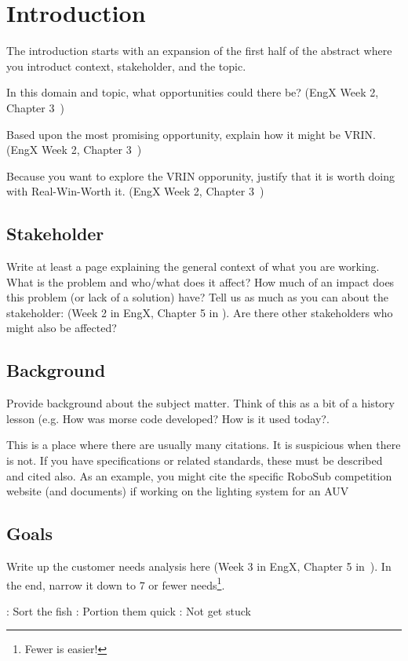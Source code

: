 \chapter{Introduction\label{cha:introduction}}

The introduction starts with an expansion of the first half of the abstract where you introduct context, stakeholder, and the topic.

In this domain and topic, what opportunities could there be?  (EngX Week 2, Chapter 3~\cite{ulrich2020product-design-development})

Based upon the most promising opportunity, explain how it might be VRIN. (EngX Week 2, Chapter 3~\cite{ulrich2020product-design-development})

Because you want to explore the VRIN opporunity, justify that it is worth doing with Real-Win-Worth it. (EngX Week 2, Chapter 3~\cite{ulrich2020product-design-development})

\section{Stakeholder}
Write at least a page explaining the general context of what you are working.
What is the problem and who/what does it affect?
How much of an impact does this problem (or lack of a solution) have?
Tell us as much as you can about the stakeholder: (Week 2 in EngX, Chapter 5 in \cite{ulrich2020product-design-development}).
Are there other stakeholders who might also be affected?

\section{Background}
Provide background about the subject matter.
Think of this as a bit of a history lesson (e.g. How was morse code
developed?  How is it used today?.

This is a place where there are usually many citations.
It is suspicious when there is not.
If you have specifications or related standards, these must be
described and cited also.
As an example, you might cite the specific
RoboSub competition website (and documents) if working on the lighting system for an AUV\cite{guls2016auvlight}

\section{Goals}
Write up the customer needs analysis here (Week 3 in EngX, Chapter 5 in~\cite{ulrich2020product-design-development}).
In the end, narrow it down to 7 or fewer needs\footnote{Fewer is easier!}. 
\begin{itemize}
  :  Sort the fish
  :  Portion them quick
  :  Not get stuck
\end{itemize}


